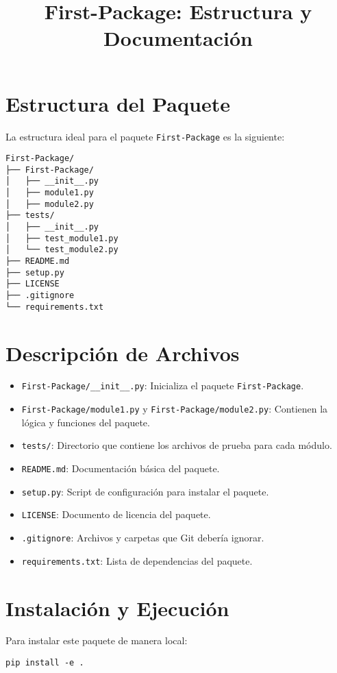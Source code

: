 \documentclass{article}
\title{First-Package: Estructura y Documentación}
\begin{document}
\maketitle
\section{Estructura del Paquete}
La estructura ideal para el paquete \texttt{First-Package} es la siguiente:

\begin{verbatim}
First-Package/
├── First-Package/
│   ├── __init__.py
│   ├── module1.py
│   ├── module2.py
├── tests/
│   ├── __init__.py
│   ├── test_module1.py
│   └── test_module2.py
├── README.md
├── setup.py
├── LICENSE
├── .gitignore
└── requirements.txt
\end{verbatim}

\section{Descripción de Archivos}
\begin{itemize}
    \item \texttt{First-Package/\_\_init\_\_.py}: Inicializa el paquete \texttt{First-Package}.
    \item \texttt{First-Package/module1.py} y \texttt{First-Package/module2.py}: Contienen la lógica y funciones del paquete.
    \item \texttt{tests/}: Directorio que contiene los archivos de prueba para cada módulo.
    \item \texttt{README.md}: Documentación básica del paquete.
    \item \texttt{setup.py}: Script de configuración para instalar el paquete.
    \item \texttt{LICENSE}: Documento de licencia del paquete.
    \item \texttt{.gitignore}: Archivos y carpetas que Git debería ignorar.
    \item \texttt{requirements.txt}: Lista de dependencias del paquete.
\end{itemize}

\section{Instalación y Ejecución}
Para instalar este paquete de manera local:

\begin{verbatim}
pip install -e .
\end{verbatim}
\end{document}
